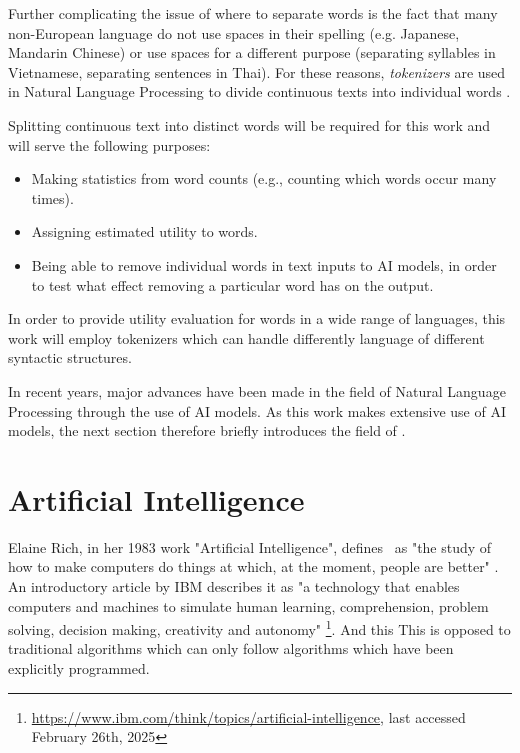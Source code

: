 Further complicating the issue of where to separate words is the fact that many non-European language do not use spaces in their spelling (e.g. Japanese, Mandarin Chinese) or use spaces for a different purpose (separating syllables in Vietnamese, separating sentences in Thai).
For these reasons, \textit{tokenizers} are used in Natural Language Processing to divide continuous texts into individual words \cite{jurafskySpeechLanguageProcessing2025}.

Splitting continuous text into distinct words will be required for this work and will serve the following purposes:
\begin{itemize}
	\item Making statistics from word counts (e.g., counting which words occur many times).
	\item Assigning estimated utility to words.
	\item Being able to remove individual words in text inputs to AI models, in order to test what effect removing a particular word has on the output.
\end{itemize}

In order to provide utility evaluation for words in a wide range of languages, this work will employ tokenizers which can handle differently language of different syntactic structures.

In recent years, major advances have been made in the field of Natural Language Processing through the use of AI models.
As this work makes extensive use of AI models, the next section therefore briefly introduces the field of \AI.

\section{Artificial Intelligence}
Elaine Rich, in her 1983 work "Artificial Intelligence", defines \AI\ as "the study of how to make computers do things at which, at the moment, people are better" \cite{rich1983artificial}.
An introductory article by IBM describes it as "a technology that enables computers and machines to simulate human learning, comprehension, problem solving, decision making, creativity and autonomy" \footnote{\url{https://www.ibm.com/think/topics/artificial-intelligence}, last accessed February 26th, 2025}.
And this
This is opposed to traditional algorithms which can only follow algorithms which have been explicitly programmed.

